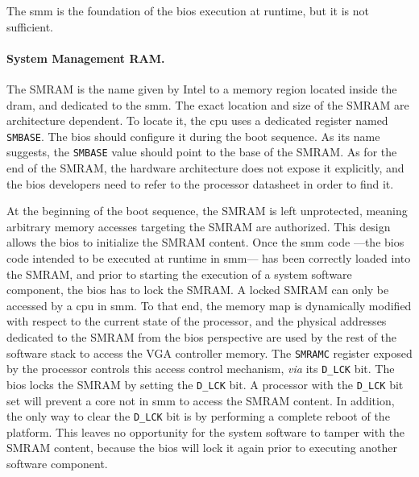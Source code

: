 The \ac{smm} is the foundation of the \ac{bios} execution at runtime, but it is
not sufficient. 

\paragraph{System Management RAM.}
%
The SMRAM is the name given by Intel to a memory region located inside the
\ac{dram}, and dedicated to the \ac{smm}.
%
The exact location and size of the SMRAM are architecture dependent.
%
To locate it, the \ac{cpu} uses a dedicated register named \texttt{SMBASE}.
%
The \ac{bios} should configure it during the boot sequence.
%
As its name suggests, the \texttt{SMBASE} value should point to the base of the
SMRAM.
%
As for the end of the SMRAM, the hardware architecture does not expose it
explicitly, and the \ac{bios} developers need to refer to the processor
datasheet in order to find it.

At the beginning of the boot sequence, the SMRAM is left unprotected, meaning
arbitrary memory accesses targeting the SMRAM are authorized.
%
This design allows the \ac{bios} to initialize the SMRAM content.
%
Once the \ac{smm} code ---the \ac{bios} code intended to be executed at runtime
in \ac{smm}--- has been correctly loaded into the SMRAM, and prior to starting
the execution of a system software component, the \ac{bios} has to lock the
SMRAM.
%
A locked SMRAM can only be accessed by a \ac{cpu} in \ac{smm}.
%
To that end, the memory map is dynamically modified with respect to the current
state of the processor, and the physical addresses dedicated to the SMRAM from
the \ac{bios} perspective are used by the rest of the software stack to access
the VGA controller memory.
%
%
The \texttt{SMRAMC} register exposed by the processor controls this access
control mechanism, \emph{via} its \texttt{D\_LCK} bit.
%
The \ac{bios} locks the SMRAM by setting the \texttt{D\_LCK} bit.
%
A processor with the \texttt{D\_LCK} bit set will prevent a core not in \ac{smm}
to access the SMRAM content.
%
In addition, the only way to clear the \texttt{D\_LCK} bit is by performing a
complete reboot of the platform.
%
This leaves no opportunity for the system software to tamper with the SMRAM
content, because the \ac{bios} will lock it again prior to executing another
software component.

